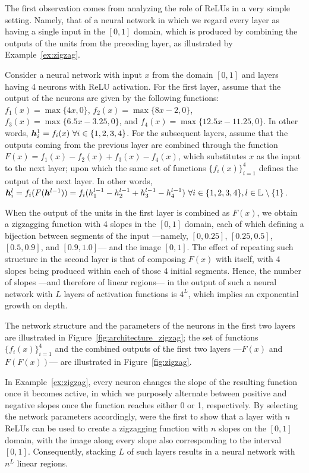 The first observation comes from analyzing the role of ReLUs in a very simple setting. 
Namely, that of a neural network in which we regard every layer as having a single input in the $[0,1]$ domain, which is produced by combining the outputs of the units from the preceding layer, 
as illustrated by Example~\ref{ex:zigzag}. 
%
\begin{example}\label{ex:zigzag}
Consider a neural network with input $x$ from the domain $[0,1]$ and layers having 4 neurons with ReLU activation. 
For the first layer, assume that the output of the neurons are given by the following functions: 
$f_1(x)=\max\{4x,0\}$, $f_2(x)=\max\{8x-2,0\}$, $f_3(x)=\max\{6.5x-3.25,0\}$, and $f_4(x)=\max\{12.5x-11.25,0\}$. 
In other words, ${\bm{h}}^1_i = f_i(x) ~\forall i \in \{1,2,3,4\}$. 
For the subsequent layers, assume that the outputs coming from the previous layer are combined through the function $F(x)=f_1(x)-f_2(x)+f_3(x)-f_4(x)$, 
which substitutes $x$ as the input to the next layer; upon which the same set of functions $\{ f_i(x) \}_{i=1}^4$ defines the output of the next layer. 
In other words, ${\bm{h}}^l_i = f_i(F({\bm{h}}^{l-1})) = f_i({h}_1^{l-1} - {h}_2^{l-1} + {h}_3^{l-1} - {h}_4^{l-1})~\forall i \in \{1,2,3,4\}, l \in {\mathbb{L}} \setminus \{ 1 \}$.

When the output of the units in the first layer is combined as $F(x)$, we obtain a zigzagging function with 4 slopes in the $[0,1]$ domain, 
each of which defining a bijection between segments of the input ---namely, $[0,0.25]$, $[0.25, 0.5]$, $[0.5, 0.9]$, and $[0.9, 1.0]$--- and the image $[0,1]$. 
The effect of repeating such structure in the second layer is that of composing $F(x)$ with itself, 
with 4 slopes being produced within each of those 4 initial segments. 
Hence, the number of slopes ---and therefore of linear regions--- in the output of such a neural network with $L$ layers of activation functions is $4^L$, 
which implies an exponential growth on depth. 

The network structure and the parameters of the neurons in the first two layers are illustrated in Figure~\ref{fig:architecture_zigzag}; the set of functions $\{ f_i(x) \}_{i=1}^4$ and the combined outputs of the first two layers ---$F(x)$ and $F(F(x))$--- are illustrated in Figure~\ref{fig:zigzag}.
\end{example}
%
In Example~\ref{ex:zigzag}, every neuron changes the slope of the resulting function once it becomes active, 
in which we purposely alternate between positive and negative slopes once the function reaches either 0 or 1, respectively. 
By selecting the network parameters accordingly, 
\cite{montufar2014on} were the first to show that a layer with $n$ ReLUs can be used to create a zigzagging function with $n$ slopes on the $[0,1]$ domain, 
with the image along every slope also corresponding to the interval $[0,1]$. 
Consequently, stacking $L$ of such layers results in a neural network with $n^L$ linear regions.  


